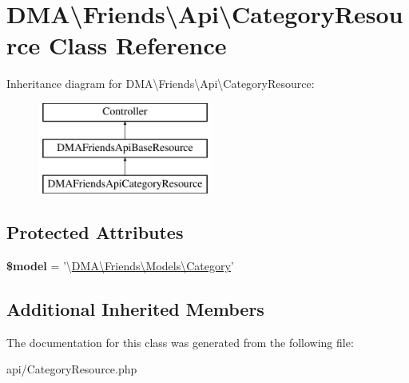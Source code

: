 \hypertarget{classDMA_1_1Friends_1_1Api_1_1CategoryResource}{\section{D\-M\-A\textbackslash{}Friends\textbackslash{}Api\textbackslash{}Category\-Resource Class Reference}
\label{classDMA_1_1Friends_1_1Api_1_1CategoryResource}
}
Inheritance diagram for D\-M\-A\textbackslash{}Friends\textbackslash{}Api\textbackslash{}Category\-Resource\-:\begin{figure}[H]
\begin{center}
\leavevmode
\includegraphics[height=3.000000cm]{d6/d3b/classDMA_1_1Friends_1_1Api_1_1CategoryResource}
\end{center}
\end{figure}
\subsection*{Protected Attributes}
\begin{DoxyCompactItemize}
\item 
\hypertarget{classDMA_1_1Friends_1_1Api_1_1CategoryResource_ab6d62dffa329fabcda1eda6bc9e8a52e}{{\bfseries \$model} = '\textbackslash{}\hyperlink{classDMA_1_1Friends_1_1Models_1_1Category}{D\-M\-A\textbackslash{}\-Friends\textbackslash{}\-Models\textbackslash{}\-Category}'}\label{classDMA_1_1Friends_1_1Api_1_1CategoryResource_ab6d62dffa329fabcda1eda6bc9e8a52e}

\end{DoxyCompactItemize}
\subsection*{Additional Inherited Members}


The documentation for this class was generated from the following file\-:\begin{DoxyCompactItemize}
\item 
api/Category\-Resource.\-php\end{DoxyCompactItemize}
